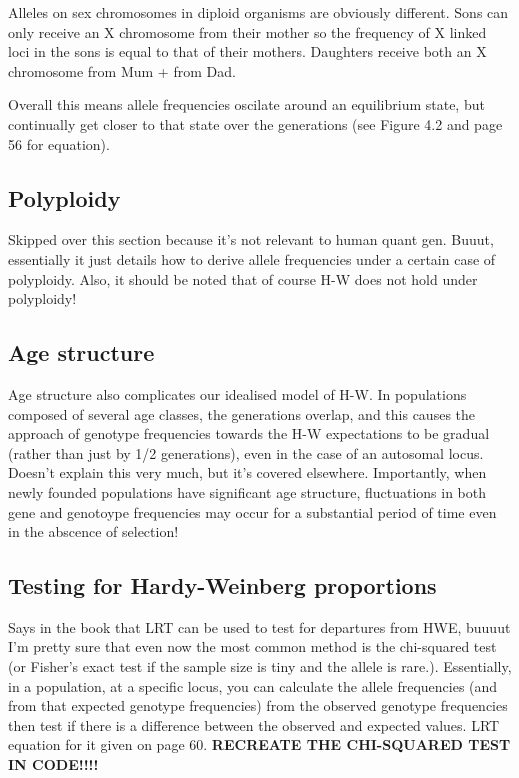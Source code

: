 \documentclass[
]{book}
\begin{document}
Alleles on sex chromosomes in diploid organisms are obviously different. Sons can only receive an X chromosome from their mother so the frequency of X linked loci in the sons is equal to that of their mothers. Daughters receive both an X chromosome from Mum + from Dad.

Overall this means allele frequencies oscilate around an equilibrium state, but continually get closer to that state over the generations (see Figure 4.2 and page 56 for equation).

\hypertarget{polyploidy}{%
\subsection{Polyploidy}\label{polyploidy}}

Skipped over this section because it's not relevant to human quant gen. Buuut, essentially it just details how to derive allele frequencies under a certain case of polyploidy. Also, it should be noted that of course H-W does not hold under polyploidy!

\hypertarget{age-structure}{%
\subsection{Age structure}\label{age-structure}}

Age structure also complicates our idealised model of H-W. In populations composed of several age classes, the generations overlap, and this causes the approach of genotype frequencies towards the H-W expectations to be gradual (rather than just by 1/2 generations), even in the case of an autosomal locus. Doesn't explain this very much, but it's covered elsewhere. Importantly, when newly founded populations have significant age structure, fluctuations in both gene and genotoype frequencies may occur for a substantial period of time even in the abscence of selection!

\hypertarget{testing-for-hardy-weinberg-proportions}{%
\subsection{Testing for Hardy-Weinberg proportions}\label{testing-for-hardy-weinberg-proportions}}

Says in the book that LRT can be used to test for departures from HWE, buuuut I'm pretty sure that even now the most common method is the chi-squared test (or Fisher's exact test if the sample size is tiny and the allele is rare.). Essentially, in a population, at a specific locus, you can calculate the allele frequencies (and from that expected genotype frequencies) from the observed genotype frequencies then test if there is a difference between the observed and expected values. LRT equation for it given on page 60. \textbf{RECREATE THE CHI-SQUARED TEST IN CODE!!!!}
\end{document}
